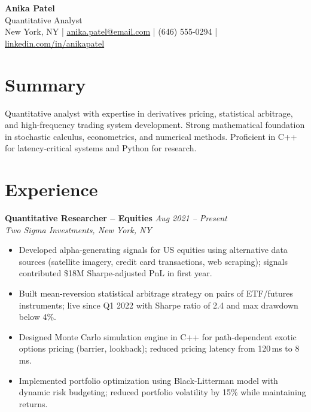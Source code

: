 \documentclass[11pt,a4paper]{article}
\begin{document}
\begin{center}
  {\LARGE \textbf{Anika Patel}}\\[3pt]
  {\large \textcolor{accent}{Quantitative Analyst}}\\[4pt]
  New York, NY \quad|\quad
  \href{mailto:anika.patel@email.com}{anika.patel@email.com} \quad|\quad
  (646) 555-0294 \quad|\quad
  \href{https://linkedin.com/in/anikapatel}{linkedin.com/in/anikapatel}
\end{center}

\section{Summary}
Quantitative analyst with expertise in derivatives pricing, statistical arbitrage, and high-frequency trading system development. Strong mathematical foundation in stochastic calculus, econometrics, and numerical methods. Proficient in C++ for latency-critical systems and Python for research.

\section{Experience}

\noindent\textbf{Quantitative Researcher -- Equities} \hfill \textit{Aug 2021 -- Present}\\
\textit{Two Sigma Investments, New York, NY}
\begin{itemize}
  \item Developed alpha-generating signals for US equities using alternative data sources (satellite imagery, credit card transactions, web scraping); signals contributed \$18M Sharpe-adjusted PnL in first year.
  \item Built mean-reversion statistical arbitrage strategy on pairs of ETF/futures instruments; live since Q1 2022 with Sharpe ratio of 2.4 and max drawdown below 4\%.
  \item Designed Monte Carlo simulation engine in C++ for path-dependent exotic options pricing (barrier, lookback); reduced pricing latency from 120\,ms to 8\,ms.
  \item Implemented portfolio optimization using Black-Litterman model with dynamic risk budgeting; reduced portfolio volatility by 15\% while maintaining returns.
\end{itemize}
\end{document}
